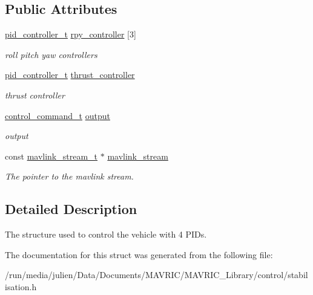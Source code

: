 \subsection*{Public Attributes}
\begin{DoxyCompactItemize}
\item 
\hypertarget{structstabiliser__t_ac1e1019078fab6c1b8cd09d030ddf2c5}{\hyperlink{structpid__controller__t}{pid\+\_\+controller\+\_\+t} \hyperlink{structstabiliser__t_ac1e1019078fab6c1b8cd09d030ddf2c5}{rpy\+\_\+controller} \mbox{[}3\mbox{]}}\label{structstabiliser__t_ac1e1019078fab6c1b8cd09d030ddf2c5}

\begin{DoxyCompactList}\small\item\em roll pitch yaw controllers \end{DoxyCompactList}\item 
\hypertarget{structstabiliser__t_afcb61161c816083a8e0fca872c6fd7f7}{\hyperlink{structpid__controller__t}{pid\+\_\+controller\+\_\+t} \hyperlink{structstabiliser__t_afcb61161c816083a8e0fca872c6fd7f7}{thrust\+\_\+controller}}\label{structstabiliser__t_afcb61161c816083a8e0fca872c6fd7f7}

\begin{DoxyCompactList}\small\item\em thrust controller \end{DoxyCompactList}\item 
\hypertarget{structstabiliser__t_a418cfe8be6eb5a4c622079b1d5274332}{\hyperlink{structcontrol__command__t}{control\+\_\+command\+\_\+t} \hyperlink{structstabiliser__t_a418cfe8be6eb5a4c622079b1d5274332}{output}}\label{structstabiliser__t_a418cfe8be6eb5a4c622079b1d5274332}

\begin{DoxyCompactList}\small\item\em output \end{DoxyCompactList}\item 
\hypertarget{structstabiliser__t_aad607d74fc88cd662e6b95fda2efeef1}{const \hyperlink{structmavlink__stream__t}{mavlink\+\_\+stream\+\_\+t} $\ast$ \hyperlink{structstabiliser__t_aad607d74fc88cd662e6b95fda2efeef1}{mavlink\+\_\+stream}}\label{structstabiliser__t_aad607d74fc88cd662e6b95fda2efeef1}

\begin{DoxyCompactList}\small\item\em The pointer to the mavlink stream. \end{DoxyCompactList}\end{DoxyCompactItemize}


\subsection{Detailed Description}
The structure used to control the vehicle with 4 P\+I\+Ds. 

The documentation for this struct was generated from the following file\+:\begin{DoxyCompactItemize}
\item 
/run/media/julien/\+Data/\+Documents/\+M\+A\+V\+R\+I\+C/\+M\+A\+V\+R\+I\+C\+\_\+\+Library/control/stabilisation.\+h\end{DoxyCompactItemize}
